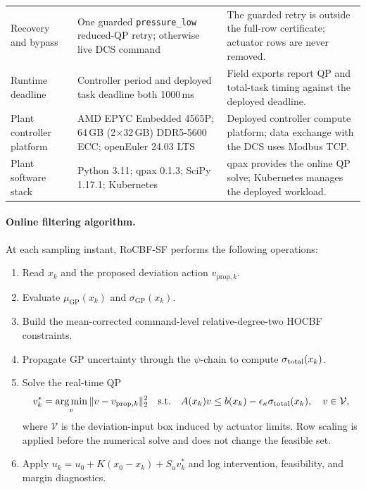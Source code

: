 \begin{table}[htbp]
\begin{tabular}{>{\raggedright\arraybackslash}p{}>{\raggedright\arraybackslash}p{}>{\raggedright\arraybackslash}p{}}
        Recovery and bypass & One guarded \texttt{pressure\_low} reduced-QP retry; otherwise live DCS command & The guarded retry is outside the full-row certificate; actuator rows are never removed. \\
        Runtime deadline & Controller period and deployed task deadline both 1000\,ms & Field exports report QP and total-task timing against the deployed deadline. \\
        Plant controller platform & AMD EPYC Embedded 4565P; 64\,GB (2$\times$32\,GB) DDR5-5600 ECC; openEuler 24.03 LTS & Deployed controller compute platform; data exchange with the DCS uses Modbus TCP. \\
        Plant software stack & Python 3.11; qpax 0.1.3; SciPy 1.17.1; Kubernetes & qpax provides the online QP solve; Kubernetes manages the deployed workload. \\
        \bottomrule
    \end{tabular}
\end{table}

\paragraph{Online filtering algorithm.}
At each sampling instant, RoCBF-SF performs the following operations:
\begin{enumerate}[label=\textbf{Step \arabic*:},leftmargin=*]
    \item Read $x_k$ and the proposed deviation action $v_{\mathrm{prop},k}$.
    \item Evaluate $\mu_{\mathrm{GP}}(x_k)$ and $\sigma_{\mathrm{GP}}(x_k)$.
    \item Build the mean-corrected command-level relative-degree-two HOCBF constraints.
    \item Propagate GP uncertainty through the $\psi$-chain to compute $\sigma_{\mathrm{total}}(x_k)$.
    \item Solve the real-time QP
    \begin{equation}
        v_k^*=\operatorname*{arg\,min}_v \|v-v_{\mathrm{prop},k}\|_2^2
        \quad \mathrm{s.t.}\quad A(x_k)v \leq b(x_k)-\epsilon_\kappa\sigma_{\mathrm{total}}(x_k),\quad v\in\mathcal{V},
        \label{eq:online_qp}
    \end{equation}
    where $\mathcal{V}$ is the deviation-input box induced by actuator limits. Row scaling is applied before the numerical solve and does not change the feasible set.
    \item Apply $u_k=u_0+K(x_0-x_k)+S_uv_k^*$ and log intervention, feasibility, and margin diagnostics.
\end{enumerate}

